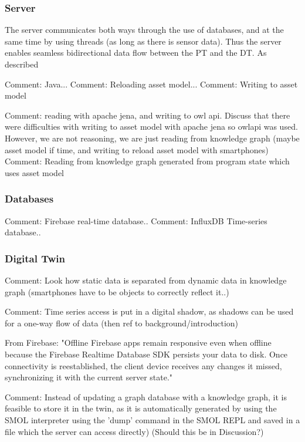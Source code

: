 \documentclass{article}
\begin{document}
\subsubsection{Server}
The server communicates both ways through the use of databases, and at the same time by using threads (as long as there is sensor data). Thus the server enables seamless bidirectional data flow between the PT and the DT. As described 

Comment: Java...
Comment: Reloading asset model...
    Comment: Writing to asset model

Comment: reading with apache jena, and writing to owl api. Discuss that there were difficulties with writing to asset model with apache jena so owlapi was used. However, we are not reasoning, we are just reading from knowledge graph (maybe asset model if time, and writing to reload asset model with smartphones)
Comment: Reading from knowledge graph generated from program state which uses asset model

\subsubsection{Databases}
Comment: Firebase real-time database..
Comment: InfluxDB Time-series database..
\subsubsection{Digital Twin}






Comment: Look how static data is separated from dynamic data in knowledge graph (smartphones have to be objects to correctly reflect it..)

Comment: Time series access is put in a digital shadow, as shadows can be used for a one-way flow of data (then ref to background/introduction)

From Firebase: "Offline	Firebase apps remain responsive even when offline because the Firebase Realtime Database SDK persists your data to disk. Once connectivity is reestablished, the client device receives any changes it missed, synchronizing it with the current server state." 

Comment: Instead of updating a graph database with a knowledge graph, it is feasible to store it in the twin, as it is automatically generated by using the SMOL interpreter using the 'dump' command in the SMOL REPL and saved in a file which the server can access directly) (Should this be in Discussion?)
\end{document}
